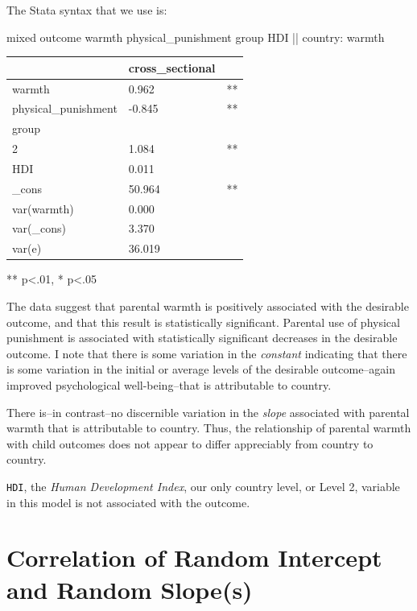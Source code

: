 \documentclass[
  letterpaper,
  DIV=11,
  numbers=noendperiod]{scrreprt}
\newenvironment{Shaded}{\begin{snugshade}}{\end{snugshade}}
\newcommand{\FunctionTok}[1]{\textcolor[rgb]{0.28,0.35,0.67}{#1}}
\newcommand{\NormalTok}[1]{\textcolor[rgb]{0.00,0.23,0.31}{#1}}
\begin{document}
The Stata syntax that we use is:

\begin{Shaded}
\begin{Highlighting}[]

\NormalTok{mixed outcome warmth physical\_punishment }\FunctionTok{group}\NormalTok{ HDI || country: warmth}
\end{Highlighting}
\end{Shaded}

\begin{longtable}[]{@{}lll@{}}
\toprule()
& cross\_sectional & \\
\midrule()
\endhead
warmth & 0.962 & ** \\
physical\_punishment & -0.845 & ** \\
group & & \\
2 & 1.084 & ** \\
HDI & 0.011 & \\
\_cons & 50.964 & ** \\
var(warmth) & 0.000 & \\
var(\_cons) & 3.370 & \\
var(e) & 36.019 & \\
\bottomrule()
\end{longtable}

** p\textless.01, * p\textless.05

The data suggest that parental warmth is positively associated with the
desirable outcome, and that this result is statistically significant.
Parental use of physical punishment is associated with statistically
significant decreases in the desirable outcome. I note that there is
some variation in the \emph{constant} indicating that there is some
variation in the initial or average levels of the desirable
outcome--again improved psychological well-being--that is attributable
to country.

There is--in contrast--no discernible variation in the \emph{slope}
associated with parental warmth that is attributable to country. Thus,
the relationship of parental warmth with child outcomes does not appear
to differ appreciably from country to country.

\texttt{HDI}, the \emph{Human Development Index}, our only country
level, or Level 2, variable in this model is not associated with the
outcome.

\hypertarget{correlation-of-random-intercept-and-random-slopes}{%
\section{Correlation of Random Intercept and Random
Slope(s)}\label{correlation-of-random-intercept-and-random-slopes}}
\end{document}
